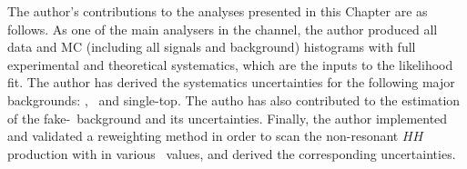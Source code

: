 The author's contributions to the analyses presented in this Chapter are as follows.
As one of the main analysers in the \lephad channel, 
the author produced all data and MC (including all signals and background) 
histograms with full experimental and theoretical systematics, which are the inputs to the likelihood fit. 
The author has derived the systematics uncertainties for the following major backgrounds:
\ttbar, \ZHF\ and single-top. The autho has also contributed to the estimation of the fake-\tauhad\
background and its uncertainties. 
Finally, the author implemented and validated a reweighting method in order to scan
the non-resonant $HH$ production with in various \kl\ values, and derived the corresponding
uncertainties. 